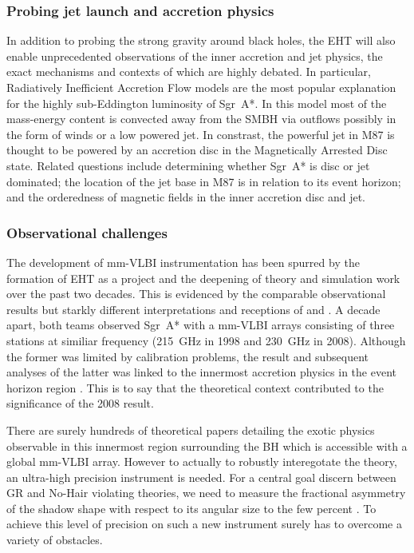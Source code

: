 \subsubsection{Probing jet launch and accretion physics}
In addition to probing the strong gravity around black holes, the EHT will also enable unprecedented observations of the inner accretion and jet physics, the exact mechanisms and contexts of which are highly debated. In particular, Radiatively Inefficient Accretion Flow \citep[(RIAF),][]{Yuan_2003} models are the most popular explanation for the highly sub-Eddington luminosity of Sgr~A*. In this model most of the mass-energy content is convected away from the SMBH via outflows possibly in the form of winds or a low powered jet. In constrast, the powerful jet in M87 is thought to be powered by an accretion disc in the Magnetically Arrested Disc \citep[(MAD),][]{Narayan_2003} state. Related questions include determining whether Sgr~A* is disc or jet dominated; the location of the jet base in M87 is in relation to its event horizon; and the orderedness of magnetic fields in the inner accretion disc and jet.

\subsubsection{Observational challenges}

The development of mm-VLBI instrumentation has been spurred by the formation of EHT as a project and the deepening of theory and simulation work over the past two decades. This is evidenced by the comparable observational results but starkly different interpretations and receptions of \citet{Krichbaum_1998} and \citet{Doeleman_2008}. A decade apart, both teams observed Sgr~A* with a mm-VLBI arrays consisting of three stations at similiar frequency (215~GHz in 1998 and 230~GHz in 2008). Although the former was limited by calibration problems, the result and subsequent analyses of the latter was linked to the innermost accretion physics in the event horizon region \citep[e.g.][]{Broderick_2011}. This is to say that the theoretical context contributed to the significance of the 2008 result. 


There are surely hundreds of theoretical papers detailing the exotic physics observable in this innermost region surrounding the BH which is accessible with a global mm-VLBI array. However to actually to robustly interegotate the theory, an ultra-high precision instrument is needed. For a central goal discern between GR and No-Hair violating theories, we need to measure the fractional asymmetry of the shadow shape with respect to its angular size to the few percent \citep{Goddi_2016}. To achieve this level of precision on such a new instrument surely has to overcome a variety of obstacles.


